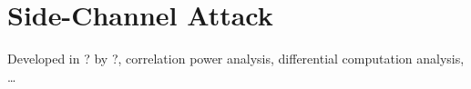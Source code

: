 \section{Side-Channel Attack}
\label{sec:side}

Developed in ? by ?, correlation power analysis, differential computation analysis, \ldots
